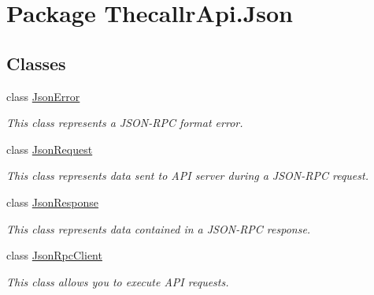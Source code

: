 \hypertarget{namespace_thecallr_api_1_1_json}{\section{Package Thecallr\+Api.\+Json}
\label{namespace_thecallr_api_1_1_json}
}
\subsection*{Classes}
\begin{DoxyCompactItemize}
\item 
class \hyperlink{class_thecallr_api_1_1_json_1_1_json_error}{Json\+Error}
\begin{DoxyCompactList}\small\item\em This class represents a J\+S\+O\+N-\/\+R\+P\+C format error. \end{DoxyCompactList}\item 
class \hyperlink{class_thecallr_api_1_1_json_1_1_json_request}{Json\+Request}
\begin{DoxyCompactList}\small\item\em This class represents data sent to A\+P\+I server during a J\+S\+O\+N-\/\+R\+P\+C request. \end{DoxyCompactList}\item 
class \hyperlink{class_thecallr_api_1_1_json_1_1_json_response}{Json\+Response}
\begin{DoxyCompactList}\small\item\em This class represents data contained in a J\+S\+O\+N-\/\+R\+P\+C response. \end{DoxyCompactList}\item 
class \hyperlink{class_thecallr_api_1_1_json_1_1_json_rpc_client}{Json\+Rpc\+Client}
\begin{DoxyCompactList}\small\item\em This class allows you to execute A\+P\+I requests. \end{DoxyCompactList}\end{DoxyCompactItemize}

